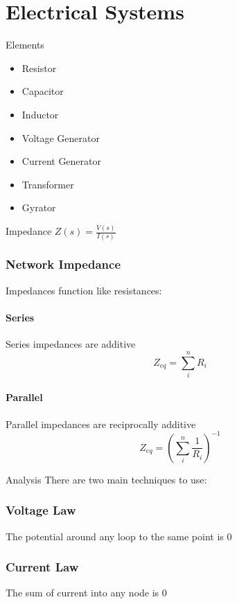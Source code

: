 \documentclass{../templates/topic}
\begin{document}
\chapter{Electrical Systems}

\begin{section}{Elements}
	\begin{itemize}
		\item Resistor
		\item Capacitor
		\item Inductor
		\item Voltage Generator
		\item Current Generator
		\item Transformer
		\item Gyrator
	\end{itemize}
\end{section}

\begin{section}{Impedance}
	 $Z(s)=\frac{V(s)}{I(s)}$
	
	\subsection{Network Impedance}
	Impedances function like resistances:
	\subsubsection*{Series}
	Series impedances are additive
	\begin{equation}
		Z_{eq} = \sum_{i}^{n}{R_i}
	\end{equation}
	\subsubsection*{Parallel}
	Parallel impedances are reciprocally additive
	\begin{equation}
		Z_{eq} = (\sum_{i}^{n}{\frac{1}{R_i}})^{-1}
	\end{equation}
\end{section}

\begin{section}{Analysis}
	There are two main techniques to use:
	\subsection{Voltage Law}
		The potential around any loop to the same point is 0
	\subsection{Current Law}
		The sum of current into any node is 0
\end{section}
\end{document}
